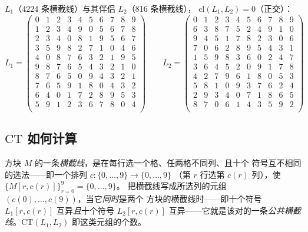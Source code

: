 \documentclass[11pt,a4paper]{ctexart}
\theoremstyle{remark}
\newcommand{\CT}{\mathrm{CT}}
\newcommand{\cl}{\mathrm{cl}}
\begin{document}
$L_1$（4224 条横截线）与其伴侣 $L_2$（816 条横截线），
$\cl(L_1,L_2)=0$（正交）：
\[
L_1=\begin{pmatrix}
  0 & 1 & 2 & 3 & 4 & 5 & 6 & 7 & 8 & 9 \\
  1 & 2 & 3 & 4 & 9 & 0 & 5 & 6 & 7 & 8 \\
  2 & 3 & 4 & 0 & 8 & 1 & 9 & 5 & 6 & 7 \\
  3 & 5 & 9 & 8 & 2 & 7 & 1 & 0 & 4 & 6 \\
  4 & 0 & 8 & 7 & 6 & 3 & 2 & 1 & 9 & 5 \\
  9 & 8 & 7 & 6 & 5 & 4 & 3 & 2 & 1 & 0 \\
  8 & 7 & 6 & 5 & 0 & 9 & 4 & 3 & 2 & 1 \\
  7 & 6 & 5 & 9 & 1 & 8 & 0 & 4 & 3 & 2 \\
  6 & 4 & 0 & 1 & 7 & 2 & 8 & 9 & 5 & 3 \\
  5 & 9 & 1 & 2 & 3 & 6 & 7 & 8 & 0 & 4 \\
\end{pmatrix}
\qquad
L_2=\begin{pmatrix}
  0 & 1 & 2 & 3 & 4 & 5 & 6 & 7 & 8 & 9 \\
  6 & 3 & 8 & 7 & 5 & 2 & 4 & 9 & 1 & 0 \\
  9 & 4 & 5 & 1 & 7 & 8 & 2 & 3 & 0 & 6 \\
  7 & 0 & 6 & 2 & 8 & 9 & 5 & 4 & 3 & 1 \\
  1 & 5 & 9 & 8 & 3 & 6 & 0 & 2 & 4 & 7 \\
  3 & 6 & 4 & 5 & 2 & 0 & 9 & 1 & 7 & 8 \\
  4 & 2 & 7 & 9 & 6 & 1 & 8 & 0 & 5 & 3 \\
  5 & 8 & 1 & 0 & 9 & 3 & 7 & 6 & 2 & 4 \\
  2 & 9 & 3 & 4 & 0 & 7 & 1 & 8 & 6 & 5 \\
  8 & 7 & 0 & 6 & 1 & 4 & 3 & 5 & 9 & 2 \\
\end{pmatrix}
\]

\subsection*{$\CT$ 如何计算}

方块 $M$ 的一条\emph{横截线}，是在每行选一个格、任两格不同列、且十个
符号互不相同的选法——即一个排列 $c:\{0,\dots,9\}\to\{0,\dots,9\}$
（第 $r$ 行选第 $c(r)$ 列），使 $\{M[r,c(r)]\}_{r=0}^{9}=\{0,\dots,9\}$。
把横截线写成所选列的元组 $(c(0),\dots,c(9))$，当它\emph{同时}是两个
方块的横截线时——即十个符号 $L_1[r,c(r)]$ 互异\emph{且}十个符号
$L_2[r,c(r)]$ 互异——它就是该对的一条\emph{公共横截线}。$\CT(L_1,L_2)$
即这类元组的个数。
\end{document}
